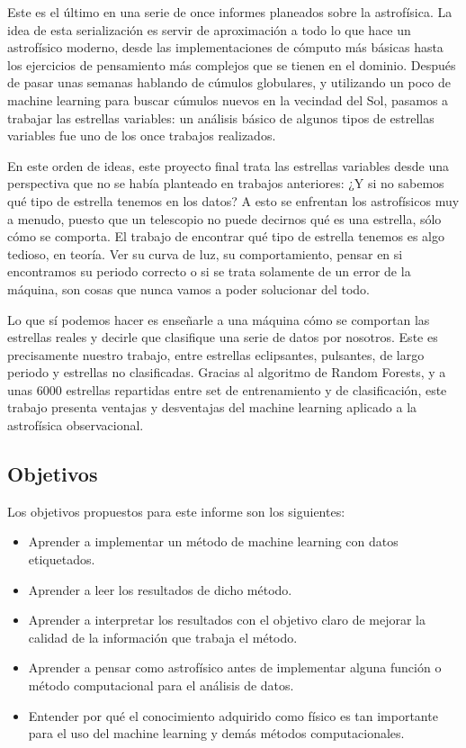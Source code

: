 \documentclass[10pt,twocolumn]{article}
\begin{document}
Este es el último en una serie de once informes planeados sobre la astrofísica. La idea de esta serialización es servir de aproximación 
a todo lo que hace un astrofísico moderno, desde las implementaciones de cómputo más básicas hasta los ejercicios de pensamiento más 
complejos que se tienen en el dominio. Después de pasar unas semanas hablando de cúmulos globulares, y utilizando un poco de machine learning
para buscar cúmulos nuevos en la vecindad del Sol, pasamos a trabajar las estrellas variables: un análisis básico de algunos tipos de estrellas 
variables fue uno de los once trabajos realizados. 

En este orden de ideas, este proyecto final trata las estrellas variables desde una perspectiva que no se había planteado en trabajos anteriores: 
¿Y si no sabemos qué tipo de estrella tenemos en los datos? A esto se enfrentan los astrofísicos muy a menudo, puesto que un telescopio no puede 
decirnos qué es una estrella, sólo cómo se comporta. El trabajo de encontrar qué tipo de estrella tenemos es algo tedioso, en teoría. Ver su curva 
de luz, su comportamiento, pensar en si encontramos su periodo correcto o si se trata solamente de un error de la máquina, son cosas que nunca 
vamos a poder solucionar del todo. 

Lo que sí podemos hacer es enseñarle a una máquina cómo se comportan las estrellas reales y decirle que 
clasifique una serie de datos por nosotros. Este es precisamente nuestro trabajo, entre estrellas eclipsantes, pulsantes, de largo periodo y estrellas
no clasificadas. Gracias al algoritmo de Random Forests, y a unas 6000 estrellas
repartidas entre set de entrenamiento y de clasificación, este trabajo presenta ventajas y desventajas del machine learning aplicado a la 
astrofísica observacional.

\subsection{Objetivos}

Los objetivos propuestos para este informe son los siguientes:
\begin{itemize}
    \item Aprender a implementar un método de machine learning con datos etiquetados.
    \item Aprender a leer los resultados de dicho método.
    \item Aprender a interpretar los resultados con el objetivo claro de mejorar la calidad de la información que trabaja el método.
    \item Aprender a pensar como astrofísico antes de implementar alguna función o método computacional para el análisis de datos.
    \item Entender por qué el conocimiento adquirido como físico es tan importante para el uso del machine learning y demás métodos computacionales.
\end{itemize}
\end{document}
